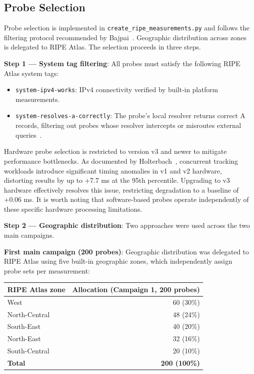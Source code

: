 \subsection{Probe Selection}
\label{subsec:3.3.1}

Probe selection is implemented in \texttt{create\_ripe\_measurements.py} and follows the filtering protocol recommended by Bajpai~\cite{Bajpai2017}. Geographic distribution across zones is delegated to RIPE Atlas. The selection proceeds in three steps.

\textbf{Step 1 --- System tag filtering}: All probes must satisfy the following RIPE Atlas system tags:

\begin{itemize}
  \item \texttt{system-ipv4-works}: \ac{IPv4} connectivity verified by built-in platform measurements.
  \item \texttt{system-resolves-a-correctly}: The probe's local resolver returns correct \ac{A} records, filtering out probes whose resolver intercepts or misroutes external queries~\cite{Boswell2024}.

\end{itemize}

Hardware probe selection is restricted to version v3 and newer to mitigate performance bottlenecks. As documented by Holterbach~\cite{Holterbach2015}, concurrent tracking workloads introduce significant timing anomalies in v1 and v2 hardware, distorting results by up to +7.7 ms at the 95th percentile. Upgrading to v3 hardware effectively resolves this issue, restricting degradation to a baseline of +0.06 ms. It is worth noting that software-based probes operate independently of these specific hardware processing limitations.

\textbf{Step 2 --- Geographic distribution}: Two approaches were used across the two main campaigns.

\textbf{First main campaign (200 probes)}: Geographic distribution was delegated to RIPE Atlas using five built-in geographic zones, which independently assign probe sets per measurement:

\begin{table}[H]
\centering
\small
\begin{tabular}{l r}
\toprule
\textbf{RIPE Atlas zone} & \textbf{Allocation (Campaign 1, 200 probes)} \\
\midrule
West           & 60 (30\%) \\
North-Central  & 48 (24\%) \\
South-East     & 40 (20\%) \\
North-East     & 32 (16\%) \\
South-Central  & 20 (10\%) \\
\textbf{Total} & \textbf{200 (100\%)} \\
\bottomrule
\end{tabular}
\end{table}

